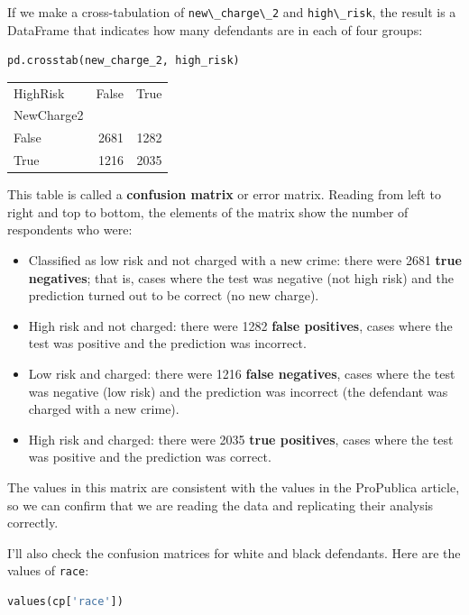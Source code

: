 If we make a cross-tabulation of
\passthrough{\lstinline!new\_charge\_2!} and
\passthrough{\lstinline!high\_risk!}, the result is a DataFrame that
indicates how many defendants are in each of four groups:

\begin{lstlisting}[language=Python,style=source]
pd.crosstab(new_charge_2, high_risk)
\end{lstlisting}

\begin{tabular}{lrr}
\toprule
HighRisk &  False &  True  \\
NewCharge2 &        &        \\
\midrule
False      &   2681 &   1282 \\
True       &   1216 &   2035 \\
\bottomrule
\end{tabular}

This table is called a \textbf{confusion matrix} or error matrix.
Reading from left to right and top to bottom, the elements of the matrix
show the number of respondents who were:

\begin{itemize}
\item
  Classified as low risk and not charged with a new crime: there were
  2681 \textbf{true negatives}; that is, cases where the test was
  negative (not high risk) and the prediction turned out to be correct
  (no new charge).
\item
  High risk and not charged: there were 1282 \textbf{false positives},
  cases where the test was positive and the prediction was incorrect.
\item
  Low risk and charged: there were 1216 \textbf{false negatives}, cases
  where the test was negative (low risk) and the prediction was
  incorrect (the defendant was charged with a new crime).
\item
  High risk and charged: there were 2035 \textbf{true positives}, cases
  where the test was positive and the prediction was correct.
\end{itemize}

The values in this matrix are consistent with the values in the
ProPublica article, so we can confirm that we are reading the data and
replicating their analysis correctly.

I'll also check the confusion matrices for white and black defendants.
Here are the values of \passthrough{\lstinline!race!}:

\begin{lstlisting}[language=Python,style=source]
values(cp['race'])
\end{lstlisting}

